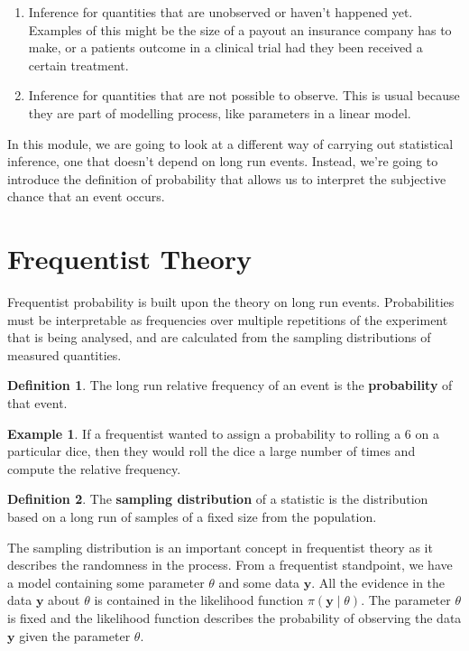 \documentclass[
]{book}
\providecommand{\tightlist}{%
  \setlength{\itemsep}{0pt}\setlength{\parskip}{0pt}}
\theoremstyle{definition}
\newtheorem{definition}{Definition}[chapter]
\theoremstyle{definition}
\newtheorem{example}{Example}[chapter]
\theoremstyle{definition}
\theoremstyle{definition}
\theoremstyle{remark}
\begin{document}
\begin{enumerate}
\def\labelenumi{\arabic{enumi}.}
\tightlist
\item
  Inference for quantities that are unobserved or haven't happened yet. Examples of this might be the size of a payout an insurance company has to make, or a patients outcome in a clinical trial had they been received a certain treatment.
\item
  Inference for quantities that are not possible to observe. This is usual because they are part of modelling process, like parameters in a linear model.
\end{enumerate}

In this module, we are going to look at a different way of carrying out statistical inference, one that doesn't depend on long run events. Instead, we're going to introduce the definition of probability that allows us to interpret the subjective chance that an event occurs.

\hypertarget{frequentist-theory}{%
\section{Frequentist Theory}\label{frequentist-theory}}

Frequentist probability is built upon the theory on long run events. Probabilities must be interpretable as frequencies over multiple repetitions of the experiment that is being analysed, and are calculated from the sampling distributions of measured quantities.

\begin{definition}
The long run relative frequency of an event is the \textbf{probability} of that event.
\end{definition}

\begin{example}
If a frequentist wanted to assign a probability to rolling a 6 on a particular dice, then they would roll the dice a large number of times and compute the relative frequency.
\end{example}

\begin{definition}
The \textbf{sampling distribution} of a statistic is the distribution based on a long run of samples of a fixed size from the population.
\end{definition}

The sampling distribution is an important concept in frequentist theory as it describes the randomness in the process. From a frequentist standpoint, we have a model containing some parameter \(\theta\) and some data \(\boldsymbol{y}\). All the evidence in the data \(\boldsymbol{y}\) about \(\theta\) is contained in the likelihood function \(\pi(\boldsymbol{y} \mid \theta)\). The parameter \(\theta\) is fixed and the likelihood function describes the probability of observing the data \(\boldsymbol{y}\) given the parameter \(\theta\).
\end{document}
